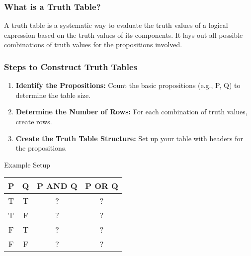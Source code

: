\documentclass[aspectratio=169]{beamer}
\begin{document}
\begin{frame}[fragile]
    \frametitle{What is a Truth Table?}
    A truth table is a systematic way to evaluate the truth values of a logical expression based on the truth values of its components. 
    It lays out all possible combinations of truth values for the propositions involved.
\end{frame}

\begin{frame}[fragile]
    \frametitle{Steps to Construct Truth Tables}
    \begin{enumerate}
        \item \textbf{Identify the Propositions:} Count the basic propositions (e.g., P, Q) to determine the table size.
        \item \textbf{Determine the Number of Rows:} For each combination of truth values, create rows.
        \item \textbf{Create the Truth Table Structure:} Set up your table with headers for the propositions.
    \end{enumerate}
    
    \begin{block}{Example Setup}
        \begin{table}[]
            \centering
            \begin{tabular}{|c|c|c|c|}
                \hline
                P & Q & P AND Q & P OR Q \\ \hline
                T & T & ? & ? \\ \hline
                T & F & ? & ? \\ \hline
                F & T & ? & ? \\ \hline
                F & F & ? & ? \\ \hline
            \end{tabular}
        \end{table}
    \end{block}
\end{frame}
\end{document}
